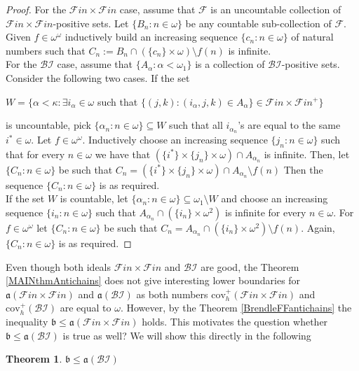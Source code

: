 \documentclass[a4paper]{amsart}
\newtheorem{theorem}{Theorem}[section]
\newcommand{\aaa}{\mathfrak{a}}
\newcommand{\bbb}{\mathfrak{b}}
\newcommand{\Baire}{\omega^{\omega}}
\newcommand{\cov}{\mathrm{cov}}
\newcommand{\FF}{\mathcal{F}in\times\mathcal{F}in}
\newcommand{\BI}{\mathcal{BI}}
\begin{document}
\begin{proof}
    For the $\FF$ case, assume that $\mathcal{F}$ is an uncountable collection of $\FF$-positive sets. Let $\{B_{n}:n\in\omega\}$ be any countable sub-collection of $\mathcal{F}$. Given $f\in\omega^{\omega}$ inductively build an increasing sequence $\{c_{n}:n\in\omega\}$ of natural numbers such that $C_{n}:=B_{n}\cap(\{c_{n}\}\times\omega)\setminus f(n)$ is infinite.\\
    For the $\BI$ case, assume that $\{A_{\alpha}:\alpha<\omega_{1}\}$ is a collection of $\BI$-positive sets. Consider the following two cases. If the set
    \begin{center}
        $W=\{\alpha<\kappa: \exists i_{\alpha}\in\omega$ such that $\{(j,k):(i_{\alpha},j,k)\in A_{\alpha}\}\in\FF^{+}\}$
    \end{center}
    is uncountable, pick $\{\alpha_{n}:n\in\omega\}\subseteq W$ such that all $i_{\alpha_{n}}$'s are equal to the same $i^{*}\in\omega$. Let $f\in\Baire$. Inductively choose an increasing sequence $\{j_{n}:n\in\omega\}$ such that for every $n\in\omega$ we have that $(\{i^{*}\}\times\{j_{n}\}\times\omega)\cap A_{\alpha_{n}}$ is infinite. Then, let $\{C_{n}:n\in\omega\}$ be such that $C_{n}=(\{i^{*}\}\times\{j_{n}\}\times\omega)\cap A_{\alpha_{n}}\setminus f(n)$
    Then the sequence $\{C_{n}:n\in\omega\}$ is as required.\\
    If the set $W$ is countable, let $\{\alpha_{n}:n\in\omega\}\subseteq \omega_{1}\setminus W$ and choose an increasing sequence $\{i_{n}:n\in\omega\}$ such that $A_{\alpha_{n}}\cap(\{i_{n}\}\times\omega^{2})$ is infinite for every $n\in\omega$. For $f\in\Baire$ let $\{C_{n}:n\in\omega\}$ be such that $C_{n}=A_{\alpha_{n}}\cap(\{i_{n}\}\times\omega^{2})\setminus f(n)$. Again, $\{C_{n}:n\in\omega\}$ is as required.
\end{proof}
Even though both ideals $\FF$ and $\BI$ are good, the Theorem \ref{MAINthmAntichains} does not give interesting lower boundaries for $\aaa(\FF)$ and $\aaa(\BI)$ as both numbers $\cov^{+}_{h}(\FF)$ and $\cov^{+}_{h}(\BI)$ are equal to $\omega$. However, by the Theorem \ref{BrendleFFantichains} the inequality $\bbb\leq\aaa(\FF)$ holds. This motivates the question whether $\bbb\leq\aaa(\BI)$ is true as well? We will show this directly in the following
\begin{theorem}\label{bbbLeqAAABi}
    $\bbb\leq\aaa(\BI)$
\end{theorem}
\end{document}
